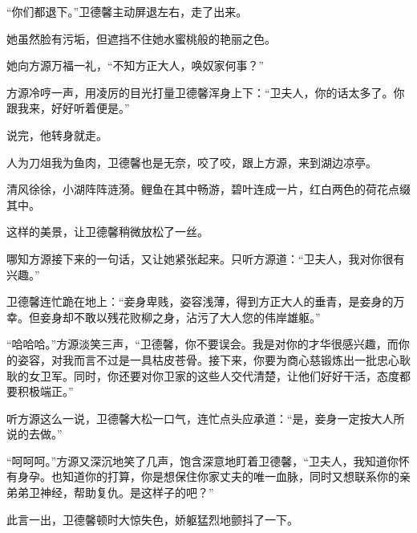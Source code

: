 \begin{this_body}
“你们都退下。”卫德馨主动屏退左右，走了出来。

她虽然脸有污垢，但遮挡不住她水蜜桃般的艳丽之色。

她向方源万福一礼，“不知方正大人，唤奴家何事？”

方源冷哼一声，用凌厉的目光打量卫德馨浑身上下：“卫夫人，你的话太多了。你跟我来，好好听着便是。”

说完，他转身就走。

人为刀俎我为鱼肉，卫德馨也是无奈，咬了咬，跟上方源，来到湖边凉亭。

清风徐徐，小湖阵阵涟漪。鲤鱼在其中畅游，碧叶连成一片，红白两色的荷花点缀其中。

这样的美景，让卫德馨稍微放松了一丝。

哪知方源接下来的一句话，又让她紧张起来。只听方源道：“卫夫人，我对你很有兴趣。”

卫德馨连忙跪在地上：“妾身卑贱，姿容浅薄，得到方正大人的垂青，是妾身的万幸。但妾身却不敢以残花败柳之身，沾污了大人您的伟岸雄躯。”

“哈哈哈。”方源淡笑三声，“卫德馨，你不要误会。我是对你的才华很感兴趣，而你的姿容，对我而言不过是一具枯皮苍骨。接下来，你要为商心慈锻炼出一批忠心耿耿的女卫军。同时，你还要对你卫家的这些人交代清楚，让他们好好干活，态度都要积极端正。”

听方源这么一说，卫德馨大松一口气，连忙点头应承道：“是，妾身一定按大人所说的去做。”

“呵呵呵。”方源又深沉地笑了几声，饱含深意地盯着卫德馨，“卫夫人，我知道你怀有身孕。也知道你的打算，你是想保住你家丈夫的唯一血脉，同时又想联系你的亲弟弟卫神经，帮助复仇。是这样子的吧？”

此言一出，卫德馨顿时大惊失色，娇躯猛烈地颤抖了一下。

\end{this_body}

